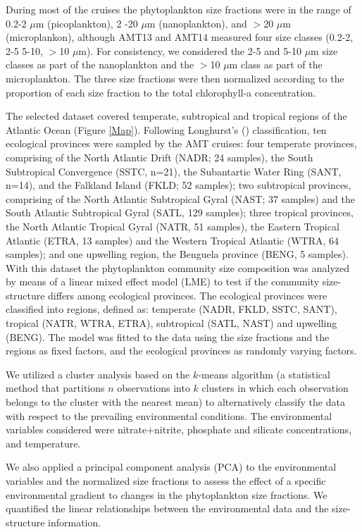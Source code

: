 During most of the cruises the phytoplankton size fractions were in the range of 0.2-2 $\mu$m (picoplankton), 2 -20 $\mu$m (nanoplankton), and $>$20 $\mu$m (microplankon), although AMT13 and AMT14 measured four size classes (0.2-2, 2-5 5-10, $>$10 $\mu$m). For consistency, we considered the 2-5 and 5-10 $\mu$m size classes as part of the nanoplankton and the $>$10 $\mu$m class as part of the microplankton. The three size fractions were then normalized according to the proportion of each size fraction to the total chlorophyll-a concentration.

The selected dataset covered temperate, subtropical and tropical regions of the Atlantic Ocean (Figure \ref{Map}). Following Longhurst's (\citeyear{Longhurst2006}) classification, ten ecological provinces were sampled by the AMT cruises: four temperate provinces, comprising of the North Atlantic Drift (NADR; 24 samples), the South Subtropical Convergence (SSTC, n=21), the Subantartic Water Ring (SANT, n=14), and the Falkland Island (FKLD; 52 samples); two subtropical provinces, comprising of the North Atlantic Subtropical Gyral (NAST; 37 samples) and the South Atlantic Subtropical Gyral (SATL, 129 samples); three tropical provinces, the North Atlantic Tropical Gyral (NATR, 51 samples), the Eastern Tropical Atlantic (ETRA, 13 samples) and the Western Tropical Atlantic (WTRA, 64 samples); and one upwelling region, the Benguela province (BENG, 5 samples). With this dataset the phytoplankton community size composition was analyzed by means of a linear mixed effect model (LME) to test if the community size-structure differs among ecological provinces. The ecological provinces were classified into regions, defined as: temperate (NADR, FKLD, SSTC, SANT), tropical (NATR, WTRA, ETRA), subtropical (SATL, NAST) and upwelling (BENG). The model was fitted to the data using the size fractions and the regions as fixed factors, and the ecological provinces as randomly varying factors.

We utilized a cluster analysis based on the $k$-means algorithm (a statistical method that partitions $n$ observations into $k$ clusters in which each observation belongs to the cluster with the nearest mean) to alternatively classify the data with respect to the prevailing environmental conditions. The environmental variables considered were nitrate+nitrite, phosphate and silicate concentrations, and temperature. 

We also applied a principal component analysis (PCA) to the environmental variables and the normalized size fractions to assess the effect of a specific environmental gradient to changes in the phytoplankton size fractions. We quantified the linear relationships between the environmental data and the size-structure information. 

